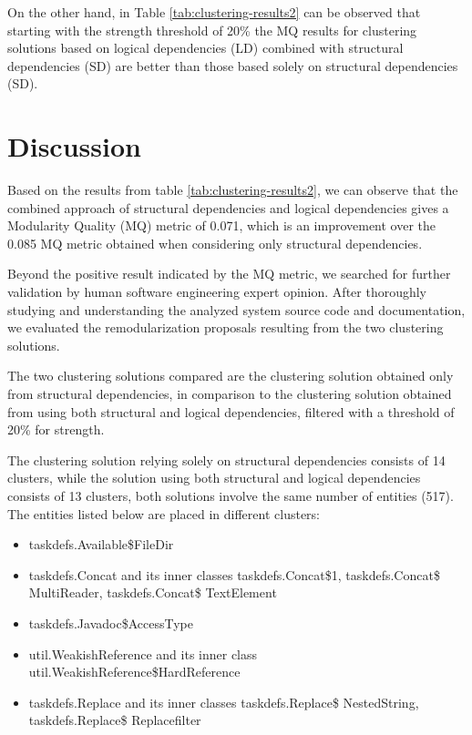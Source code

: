 \documentclass[conference]{IEEEtran}
\begin{document}
On the other hand, in Table \ref{tab:clustering-results2} can be observed that starting with the strength threshold of 20\% the MQ results for clustering solutions based on logical dependencies (LD) combined with structural dependencies (SD) are better than those based solely on structural dependencies (SD). 


\section{Discussion}
\label{discussion}

Based on the results from table \ref{tab:clustering-results2}, we can observe that the combined approach of structural dependencies and logical dependencies gives a Modularity Quality (MQ) metric of 0.071, which is an improvement over the 0.085 MQ metric obtained when considering only structural dependencies. 

Beyond the positive result indicated by the MQ metric, we searched for further validation by human software engineering expert opinion. After thoroughly studying and understanding the analyzed system source code and documentation, we evaluated the remodularization proposals resulting from the two clustering solutions.

The two clustering solutions compared are the clustering solution obtained only from structural dependencies, in comparison to the clustering solution obtained from using both structural and logical dependencies, filtered with a threshold of 20\% for strength.

The clustering solution relying solely on structural dependencies consists of 14 clusters, while the solution using both structural and logical dependencies consists of 13 clusters, both solutions involve the same number of entities (517). The entities listed below are placed in different clusters: 


\begin{itemize}
    \item taskdefs.Available\$FileDir
    \item taskdefs.Concat and its inner classes taskdefs.Concat\$1, taskdefs.Concat\$ MultiReader, taskdefs.Concat\$ TextElement
    \item taskdefs.Javadoc\$AccessType
    \item util.WeakishReference and its inner class util.WeakishReference\$HardReference
    \item taskdefs.Replace and its inner classes taskdefs.Replace\$ NestedString, taskdefs.Replace\$ Replacefilter
\end{itemize}
\end{document}
